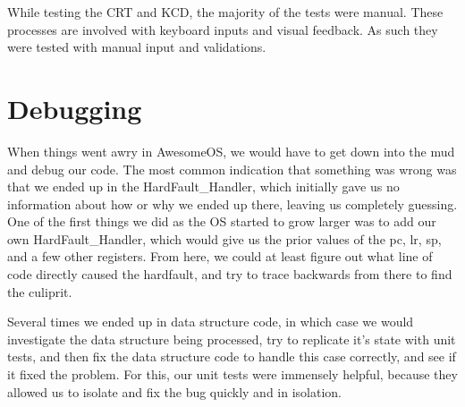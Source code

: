 \documentclass[12pt]{report}
\begin{document}
While testing the CRT and KCD, the majority of the tests were manual. These processes are involved with keyboard inputs and visual feedback. As such they were tested with manual input and validations.

\section{Debugging}
When things went awry in AwesomeOS, we would have to get down into the mud and debug our code. The most common indication that something was wrong was that we ended up in the HardFault\_Handler, which initially gave us no information about how or why we ended up there, leaving us completely guessing. One of the first things we did as the OS started to grow larger was to add our own HardFault\_Handler, which would give us the prior values of the pc, lr, sp, and a few other registers. From here, we could at least figure out what line of code directly caused the hardfault, and try to trace backwards from there to find the culiprit.

Several times we ended up in data structure code, in which case we would investigate the data structure being processed, try to replicate it's state with unit tests, and then fix the data structure code to handle this case correctly, and see if it fixed the problem. For this, our unit tests were immensely helpful, because they allowed us to isolate and fix the bug quickly and in isolation.
\end{document}
